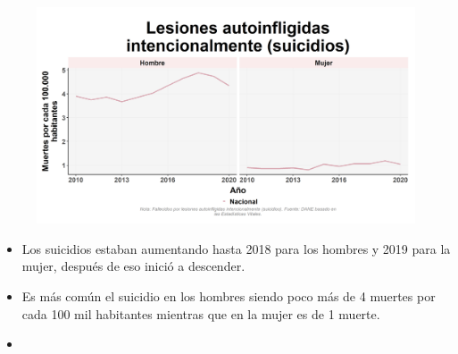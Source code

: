     \begin{figure}[H]
        \caption[Lesiones autoinfligidas intencionalmente (suicidios) por género ]{\label{suicid_gen_trend} }
        \begin{center}
        \includegraphics[width=\textwidth,keepaspectratio]{img/var_296_trend.png}
        \end{center}
    \end{figure}
            \begin{itemize}
                \item Los suicidios estaban aumentando hasta 2018 para los hombres y 2019 para la mujer, después de eso inició a descender.
                \item Es más común el suicidio en los hombres siendo poco más de 4 muertes por cada 100 mil habitantes mientras que en la mujer es de 1 muerte.
                \item 
                \end{itemize}

